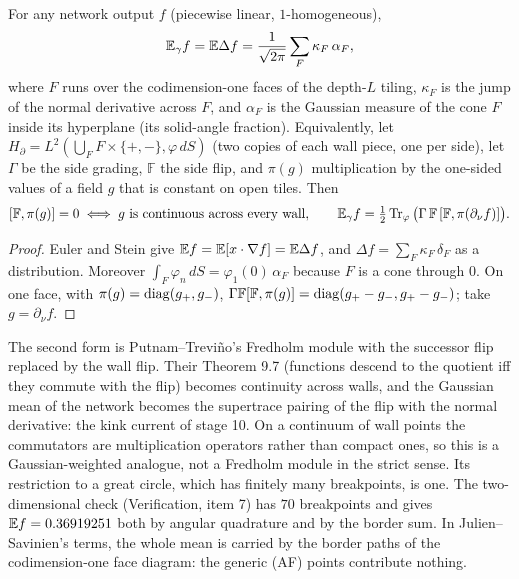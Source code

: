 \begin{proposition}\label{prop:border}
For any network output $f$ (piecewise linear, $1$-homogeneous),
\[
\mathbb E_\gamma f=\mathbb E\Delta f=\frac1{\sqrt{2\pi}}\sum_{F}\kappa_F\,\alpha_F ,
\]
where $F$ runs over the codimension-one faces of the depth-$L$ tiling, $\kappa_F$ is the jump of the normal derivative across $F$, and $\alpha_F$
is the Gaussian measure of the cone $F$ inside its hyperplane (its solid-angle fraction). Equivalently, let $H_\partial=L^2(\bigcup_FF\times\{+,-\},\varphi\,dS)$
(two copies of each wall piece, one per side), let $\Gamma$ be the side grading, $\mathbb F$ the side flip, and $\pi(g)$ multiplication by the
one-sided values of a field $g$ that is constant on open tiles. Then
\[
[\mathbb F,\pi(g)]=0\iff g\ \text{is continuous across every wall},\qquad
\mathbb E_\gamma f=\tfrac12\operatorname{Tr}_\varphi\big(\Gamma\,\mathbb F\,[\mathbb F,\pi(\partial_\nu f)]\big).
\]
\end{proposition}
\begin{proof}
Euler and Stein give $\mathbb E f=\mathbb E[x\cdot\nabla f]=\mathbb E\Delta f$, and $\Delta f=\sum_F\kappa_F\,\delta_F$ as a distribution. Moreover $\int_F\varphi_n\,dS=\varphi_1(0)\,\alpha_F$
because $F$ is a cone through $0$. On one face, with $\pi(g)=\operatorname{diag}(g_+,g_-)$, $\Gamma\mathbb F[\mathbb F,\pi(g)]=\operatorname{diag}(g_+-g_-,g_+-g_-)$; take $g=\partial_\nu f$.
\end{proof}
The second form is Putnam--Trevi\~no's Fredholm module with the successor flip replaced by the wall flip. Their Theorem 9.7 (functions
descend to the quotient iff they commute with the flip) becomes continuity across walls, and the Gaussian mean of the network becomes the
supertrace pairing of the flip with the normal derivative: the kink current of stage 10. On a continuum of wall points the commutators
are multiplication operators rather than compact ones, so this is a Gaussian-weighted analogue, not a Fredholm module in the strict
sense. Its restriction to a great circle, which has finitely many breakpoints, is one. The two-dimensional check (Verification,
item 7) has $70$ breakpoints and gives $\mathbb E f=0.36919251$ both by angular quadrature and by the border sum. In Julien--Savinien's terms, the
whole mean is carried by the border paths of the codimension-one face diagram: the generic (AF) points contribute nothing.
